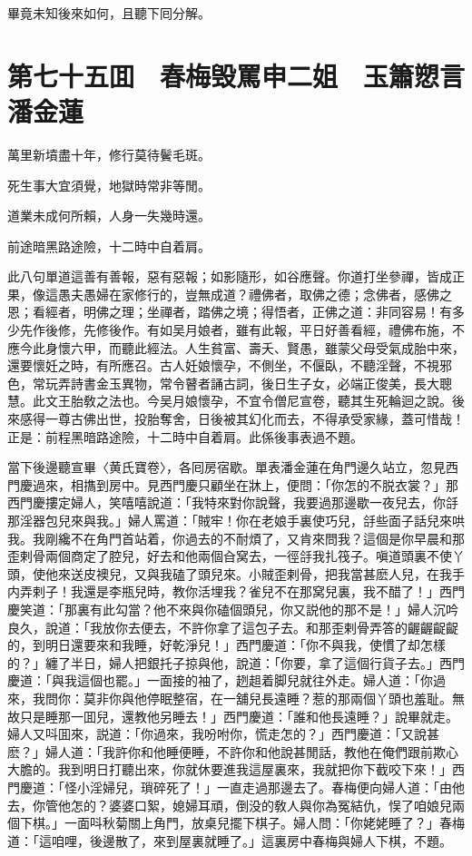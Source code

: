 畢竟未知後來如何，且聽下囘分解。

\chapter*{第七十五囬　春梅毁罵申二姐　玉簫愬言潘金蓮}

萬里新墳盡十年，修行莫待鬢毛斑。

死生事大宜須覺，地獄時常非等閒。

道業未成何所賴，人身一失幾時還。

前途暗黑路途險，十二時中自着肩。

此八句單道這善有善報，惡有惡報；如影隨形，如谷應聲。你道打坐參禪，皆成正果，像這愚夫愚婦在家修行的，豈無成道？禮佛者，取佛之德；念佛者，感佛之恩；看經者，明佛之理；坐禪者，踏佛之境；得悟者，正佛之道：非同容易！有多少先作後修，先修後作。有如吴月娘者，雖有此報，平日好善看經，禮佛布施，不應今此身懷六甲，而聽此經法。人生貧富、壽夭、賢愚，雖蒙父母受氣成胎中來，還要懷妊之時，有所應召。古人妊娘懷孕，不側坐，不偃臥，不聽淫聲，不視邪色，常玩弄詩書金玉異物，常令瞽者誦古詞，後日生子女，必端正俊美，長大聰慧。此文王胎敎之法也。今吴月娘懷孕，不宜令僧尼宣卷，聽其生死輪迴之說。後來感得一尊古佛出世，投胎奪舍，日後被其幻化而去，不得承受家緣，蓋可惜哉！正是：前程黑暗路途險，十二時中自着肩。此係後事表過不題。

當下後邊聽宣畢〈黄氏寶卷〉，各囘房宿歇。單表潘金蓮在角門邊久站立，忽見西門慶過來，相㩦到房中。見西門慶只顧坐在牀上，便問：「你怎的不脱衣裳？」那西門慶摟定婦人，笑嘻嘻說道：「我特來對你說聲，我要過那邊歇一夜兒去，你㧱那淫器包兒來與我。」婦人罵道：「賊牢！你在老娘手裏使巧兒，㧱些面子話兒來哄我。我剛纔不在角門首站着，你過去的不耐煩了，又肯來問我？這個是你早晨和那歪剌骨兩個商定了腔兒，好去和他兩個㒲窝去，一徑㧱我扎筏子。嗔道頭裏不使丫頭，使他來送皮襖兒，又與我磕了頭兒來。小賊歪剌骨，把我當甚麽人兒，在我手内弄剌子！我還是李瓶兒時，教你活埋我？雀兒不在那窝兒裏，我不醋了！」西門慶笑道：「那裏有此勾當？他不來與你磕個頭兒，你又説他的那不是！」婦人沉吟良久，說道：「我放你去便去，不許你拿了這包子去。和那歪剌骨弄答的齷齷齪齪的，到明日還要來和我睡，好乾淨兒！」西門慶道：「你不與我，使慣了却怎樣的？」纏了半日，婦人把銀托子掠與他，說道：「你要，拿了這個行貨子去。」西門慶道：「與我這個也罷。」一面接的袖了，趔趄着脚兒就往外走。婦人道：「你過來，我問你：莫非你與他停眠整宿，在一舖兒長遠睡？惹的那兩個丫頭也羞耻。無故只是睡那一囬兒，還教他另睡去！」西門慶道：「誰和他長遠睡？」說畢就走。婦人又呌囬來，説道：「你過來，我吩咐你，慌走怎的？」西門慶道：「又說甚麽？」婦人道：「我許你和他睡便睡，不許你和他說甚閒話，教他在俺們跟前欺心大膽的。我到明日打聽出來，你就休要進我這屋裏來，我就把你下截咬下來！」西門慶道：「怪小淫婦兒，瑣碎死了！」一直走過那邊去了。春梅便向婦人道：「由他去，你管他怎的？婆婆口絮，媳婦耳頑，倒没的敎人與你為冤結仇，悮了咱娘兒兩個下棋。」一面呌秋菊關上角門，放桌兒擺下棋子。婦人問：「你姥姥睡了？」春梅道：「這咱哩，後邊散了，來到屋裏就睡了。」這裏房中春梅與婦人下棋，不題。

